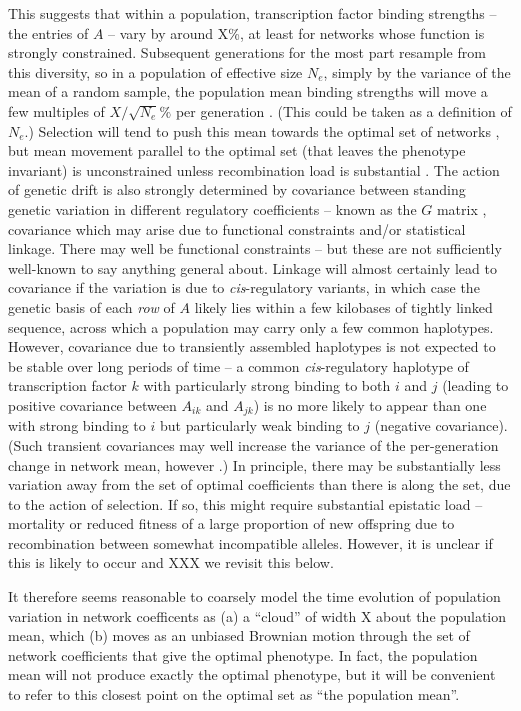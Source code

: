 \documentclass[9 pt]{article}
\newcommand{\1}{\mathbbm{1}}
\begin{document}
  This suggests that within a population, transcription factor binding strengths 
  -- the entries of $A$ --
  vary by around X\%, at least for networks whose function is strongly constrained.
  Subsequent generations for the most part resample from this diversity,
  so in a population of effective size $N_e$,
  simply by the variance of the mean of a random sample,
  the population mean binding strengths
  will move a few multiples of $X/\sqrt{N_e}\%$ per generation \citep{lande_drift}.
  (This could be taken as a definition of $N_e$.)
  Selection will tend to push this mean towards the optimal set of networks \citep{ou_process},
  but mean movement parallel to the optimal set (that leaves the phenotype invariant) is unconstrained
  unless recombination load is substantial \citep{recomb_load}.
  The action of genetic drift is also strongly determined by covariance between 
  standing genetic variation in different regulatory coefficients -- known as the $G$ matrix \citep{G_matrix},
  covariance which may arise due to functional constraints and/or statistical linkage.
  There may well be functional constraints -- but these are not sufficiently well-known to say anything general about.
  Linkage will almost certainly lead to covariance
  if the variation is due to \textit{cis}-regulatory variants,
  in which case the genetic basis of each \emph{row} of $A$ likely lies within a few kilobases of tightly linked sequence,
  across which a population may carry only a few common haplotypes.
  However, covariance due to transiently assembled haplotypes is not expected to be stable over long periods of time --
  a common \textit{cis}-regulatory haplotype of transcription factor $k$ with particularly strong binding to both $i$ and $j$
  (leading to positive covariance between $A_{ik}$ and $A_{jk}$)
  is no more likely to appear than one with strong binding to $i$ but particularly weak binding to $j$ (negative covariance).
  (Such transient covariances may well increase the variance of the per-generation change in network mean, however \citep{barton_linkage}.)
  In principle, there may be substantially less variation away from the set of optimal coefficients 
  than there is along the set, due to the action of selection.
  If so, this might require substantial epistatic load 
  -- mortality or reduced fitness of a large proportion of new offspring due to recombination between somewhat incompatible alleles.
  However, it is unclear if this is likely to occur and XXX we revisit this below.

  It therefore seems reasonable to coarsely model the time evolution of population variation in network coefficents as 
  (a) a ``cloud'' of width X about the population mean, 
  which (b) moves as an unbiased Brownian motion through the set of network coefficients that give the optimal phenotype.
  In fact, the population mean will not produce exactly the optimal phenotype,
  but it will be convenient to refer to this closest point on the optimal set as ``the population mean''.
\end{document}
